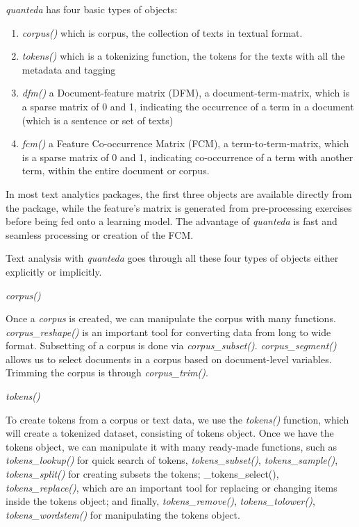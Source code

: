 \documentclass[
]{article}
\providecommand{\tightlist}{%
  \setlength{\itemsep}{0pt}\setlength{\parskip}{0pt}}
\begin{document}
\emph{quanteda} has four basic types of objects:

\begin{enumerate}
\def\labelenumi{\arabic{enumi}.}
\tightlist
\item
  \emph{corpus()} which is corpus, the collection of texts in textual format.
\item
  \emph{tokens()} which is a tokenizing function, the tokens for the texts with all the metadata and tagging
\item
  \emph{dfm()} a Document-feature matrix (DFM), a document-term-matrix, which is a sparse matrix of 0 and 1, indicating the occurrence of a term in a document (which is a sentence or set of texts)
\item
  \emph{fcm()} a Feature Co-occurrence Matrix (FCM), a term-to-term-matrix, which is a sparse matrix of 0 and 1, indicating co-occurrence of a term with another term, within the entire document or corpus.
\end{enumerate}

In most text analytics packages, the first three objects are available directly from the package, while the feature's matrix is generated from pre-processing exercises before being fed onto a learning model. The advantage of \emph{quanteda} is fast and seamless processing or creation of the FCM.

Text analysis with \emph{quanteda} goes through all these four types of objects either explicitly or implicitly.

\emph{corpus()}

Once a \emph{corpus} is created, we can manipulate the corpus with many functions. \emph{corpus\_reshape()} is an important tool for converting data from long to wide format. Subsetting of a corpus is done via \emph{corpus\_subset()}. \emph{corpus\_segment()} allows us to select documents in a corpus based on document-level variables. Trimming the corpus is through \emph{corpus\_trim()}.

\emph{tokens()}

To create tokens from a corpus or text data, we use the \emph{tokens()} function, which will create a tokenized dataset, consisting of tokens object. Once we have the tokens object, we can manipulate it with many ready-made functions, such as \emph{tokens\_lookup()} for quick search of tokens, \emph{tokens\_subset()}, \emph{tokens\_sample()}, \emph{tokens\_split()} for creating subsets the tokens; \_tokens\_select(), \emph{tokens\_replace()}, which are an important tool for replacing or changing items inside the tokens object; and finally, \emph{tokens\_remove()}, \emph{tokens\_tolower()}, \emph{tokens\_wordstem()} for manipulating the tokens object.
\end{document}

